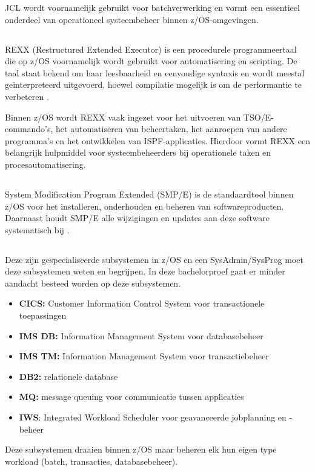 JCL wordt voornamelijk gebruikt voor batchverwerking en vormt een essentieel onderdeel van operationeel systeembeheer binnen z/OS-omgevingen.

\subsection{}
\label{sec:rexx-op-zos}

REXX (Restructured Extended Executor) is een procedurele programmeertaal die op z/OS voornamelijk wordt gebruikt voor automatisering en scripting. De taal staat bekend om haar leesbaarheid en eenvoudige syntaxis en wordt meestal geïnterpreteerd uitgevoerd, hoewel compilatie mogelijk is om de performantie te verbeteren \autocite{IBM_zOS_Concepts}.

Binnen z/OS wordt REXX vaak ingezet voor het uitvoeren van TSO/E-commando’s, het automatiseren van beheertaken, het aanroepen van andere programma’s en het ontwikkelen van ISPF-applicaties. Hierdoor vormt REXX een belangrijk hulpmiddel voor systeembeheerders bij operationele taken en procesautomatisering.

\subsection{}
\label{sec:smpe-op-zos}
System Modification Program Extended (SMP/E) is de standaardtool binnen z/OS voor het installeren, onderhouden en beheren van softwareproducten. Daarnaast houdt SMP/E alle wijzigingen en updates aan deze software systematisch bij \autocite{IBM_zOS_Concepts}.

\subsection{}
\label{sec:fsubsystemen-in-zos}

Deze zijn gespecialiseerde subsystemen in z/OS en een SysAdmin/SysProg moet deze subsystemen weten en begrijpen. In deze bachelorproef gaat er minder aandacht besteed worden op deze subsystemen.
\begin{itemize}
	\item \textbf{CICS:} Customer Information Control System voor transactionele toepassingen
	\item \textbf{IMS DB:} Information Management System voor databasebeheer
	\item \textbf{IMS TM:} Information Management System voor transactiebeheer
	\item \textbf{DB2:} relationele database
	\item \textbf{MQ:} message queuing voor communicatie tussen applicaties
	\item \textbf{IWS}: Integrated Workload Scheduler voor geavanceerde jobplanning en -beheer
\end{itemize}
Deze subsystemen draaien binnen z/OS maar beheren elk hun eigen type workload (batch, transacties, databasebeheer).



